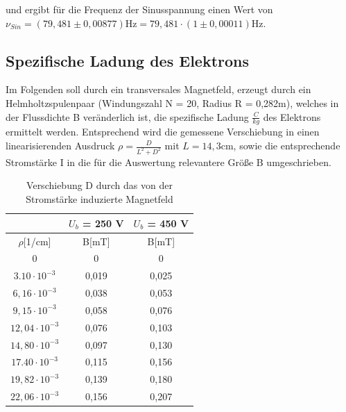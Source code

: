 und ergibt für die Frequenz der Sinusspannung einen Wert von \newline
$\nu_{Sin} = (79,481 \pm 0,00877) \text{Hz} = 79,481 \cdot (1 \pm 0,00011) \text{Hz}$.

\subsection{Spezifische Ladung des Elektrons}
Im Folgenden soll durch ein transversales Magnetfeld, erzeugt durch ein Helmholtzspulenpaar (Windungszahl N = 20, Radius R = 0,282m), welches in der Flussdichte B 
veränderlich ist, die spezifische Ladung $\frac{C}{kg}$ des Elektrons ermittelt werden. Entsprechend wird
die gemessene Verschiebung in einen linearisierenden Ausdruck $\rho = \frac{D}{L^2 + D^2}$ mit $L=14,3\text{cm}$, sowie die entsprechende
Stromstärke I in die für die Auswertung relevantere Größe B umgeschrieben.

\renewcommand{\arraystretch}{1.2}
\begin{table}[htbp]
\centering
 \begin{tabular}{c|c|c}
  & $U_b$ = 250 V & $U_b$ = 450 V \\
  \hline
  $\rho$[1/cm] & B[mT] & B[mT]\\
  \hline
  0	&0	&0\\
$3.10\cdot10^{-3}$	&0,019	&0,025\\
$6,16\cdot10^{-3}$	&0,038	&0,053\\
$9,15\cdot10^{-3}$	&0,058	&0,076\\
$12,04\cdot10^{-3}$	&0,076	&0,103\\
$14,80\cdot10^{-3}$	&0,097	&0,130\\
$17.40\cdot10^{-3}$	&0,115	&0,156\\
$19,82\cdot10^{-3}$	&0,139	&0,180\\
$22,06\cdot10^{-3}$	&0,156	&0,207\\
 \end{tabular}
 \caption{Verschiebung D durch das von der Stromstärke induzierte Magnetfeld}
\end{table}
\renewcommand{\arraystretch}{1}

